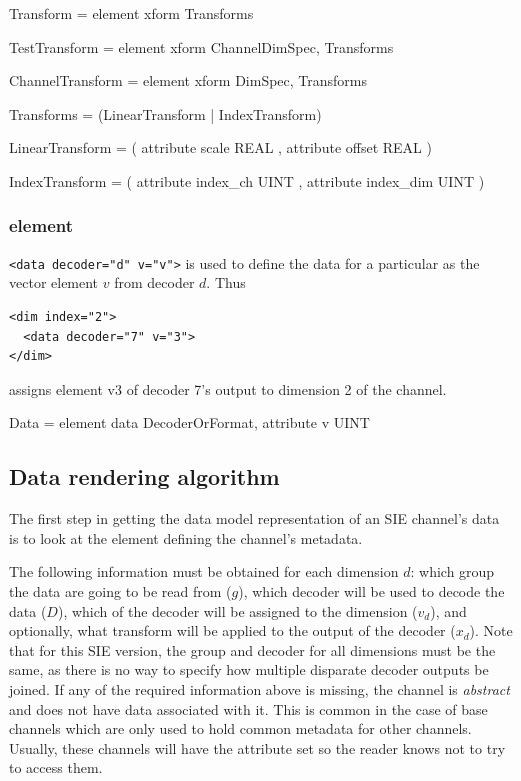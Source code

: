 \documentclass{article}
\begin{document}
\begin{grammar}
Transform = element xform { Transforms }
\end{grammar}
\begin{grammar}
TestTransform = element xform { ChannelDimSpec, Transforms }
\end{grammar}
\begin{grammar}
ChannelTransform = element xform { DimSpec, Transforms }
\end{grammar}
\begin{grammar}
Transforms = (LinearTransform | IndexTransform)
\end{grammar}
\begin{grammar}
LinearTransform = (
  attribute scale { REAL },
  attribute offset { REAL }
)
\end{grammar}
\begin{grammar}
IndexTransform = (
  attribute index_ch { UINT },
  attribute index_dim { UINT }
)
\end{grammar}

\subsubsection{ element}

\lstinline[language=siexml]!<data decoder="d" v="v">! is used to
define the data for a particular  as the vector element
$v$ from decoder $d$.  Thus
\begin{lstlisting}[language=siexml]
<dim index="2">
  <data decoder="7" v="3">
</dim>
\end{lstlisting}
assigns element v3 of decoder 7's output to dimension 2 of the
channel.

\begin{grammar}
Data = element data {
  DecoderOrFormat,
  attribute v { UINT }
}
\end{grammar}

\subsection{Data rendering algorithm}

The first step in getting the data model representation of an SIE
channel's data is to look at the  element defining the
channel's metadata.

The following information must be obtained for each dimension $d$:
which group the data are going to be read from ($g$), which decoder
will be used to decode the data ($D$), which  of the decoder
will be assigned to the dimension ($v_d$), and optionally, what
transform will be applied to the output of the decoder ($x_d$).  Note
that for this SIE version, the group and decoder for all dimensions
must be the same, as there is no way to specify how multiple disparate
decoder outputs be joined.  If any of the required information above
is missing, the channel is \emph{abstract} and does not have data
associated with it.  This is common in the case of base channels which
are only used to hold common metadata for other channels.  Usually,
these channels will have the  attribute set so the reader
knows not to try to access them.
\end{document}
